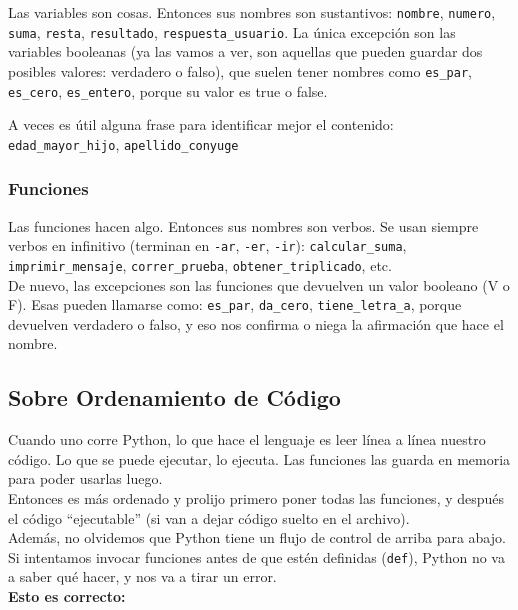 \documentclass[
  letterpaper,
  DIV=11,
  numbers=noendperiod]{scrreprt}
\begin{document}
Las variables son cosas. Entonces sus nombres son sustantivos:
\texttt{nombre}, \texttt{numero}, \texttt{suma}, \texttt{resta},
\texttt{resultado}, \texttt{respuesta\_usuario}. La única excepción son
las variables booleanas (ya las vamos a ver, son aquellas que pueden
guardar dos posibles valores: verdadero o falso), que suelen tener
nombres como \texttt{es\_par}, \texttt{es\_cero}, \texttt{es\_entero},
porque su valor es true o false.

A veces es útil alguna frase para identificar mejor el contenido:\\
\texttt{edad\_mayor\_hijo}, \texttt{apellido\_conyuge}

\subsubsection{Funciones}\label{funciones-1}

Las funciones hacen algo. Entonces sus nombres son verbos. Se usan
siempre verbos en infinitivo (terminan en \texttt{-ar}, \texttt{-er},
\texttt{-ir}): \texttt{calcular\_suma}, \texttt{imprimir\_mensaje},
\texttt{correr\_prueba}, \texttt{obtener\_triplicado}, etc.\\
De nuevo, las excepciones son las funciones que devuelven un valor
booleano (V o F). Esas pueden llamarse como: \texttt{es\_par},
\texttt{da\_cero}, \texttt{tiene\_letra\_a}, porque devuelven verdadero
o falso, y eso nos confirma o niega la afirmación que hace el nombre.

\subsection{Sobre Ordenamiento de
Código}\label{sobre-ordenamiento-de-cuxf3digo}

Cuando uno corre Python, lo que hace el lenguaje es leer línea a línea
nuestro código. Lo que se puede ejecutar, lo ejecuta. Las funciones las
guarda en memoria para poder usarlas luego.\\
Entonces es más ordenado y prolijo primero poner todas las funciones, y
después el código ``ejecutable'' (si van a dejar código suelto en el
archivo).\\

Además, no olvidemos que Python tiene un flujo de control de arriba para
abajo. Si intentamos invocar funciones antes de que estén definidas
(\texttt{def}), Python no va a saber qué hacer, y nos va a tirar un
error.\\

\textbf{Esto es correcto:}
\end{document}
